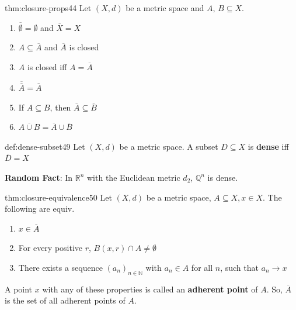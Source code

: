 \documentclass[landscape, 8pt]{extarticle}
\begin{document}
\begin{multicols}{3}
\begin{thm}{thm:closure-props}{44}
    \vspace{-5pt}
    Let $(X, d)$ be a metric space and $A,\,B \subseteq X$.
    \vspace{-15pt}
    \begin{multicols}{2}
        \begin{enumerate}[leftmargin=*]
            \item $\overline{\emptyset} = \emptyset$ and $\overline{X} = X$
            \item $A \subseteq \overline{A}$ and $\overline{A}$ is closed
            \item $A$ is closed iff $A = \overline{A}$
            \item $\overline{\overline{A}} = \overline{A}$
            \item If $A \subseteq B$, then $\overline{A} \subseteq \overline{B}$
            \item $\overline{A \cup B} = \overline{A} \cup \overline{B}$
        \end{enumerate}
    \end{multicols}
\end{thm}


\begin{dfn}{def:dense-subset}{49}
    Let $(X, d)$ be a metric space. A subset $D \subseteq X$ is \textbf{dense} iff $\overline{D} = X$

    \longrule{0.08ex}
    \textbf{Random Fact}: In $\mathbb{R}^{n}$ with the Euclidean metric $d_{2}$, $\mathbb{Q}^{n}$ is dense.
\end{dfn}

\begin{thm}{thm:closure-equivalence}{50}
    \vspace{-5pt}
    Let $(X, d)$ be a metric space, $A \subseteq X, x\in X$. The following are equiv.
    \vspace{-10pt}
    \begin{enumerate}
        \item $x\in\overline{A}$
        \item For every positive $r$, $B(x,r) \cap A \ne \emptyset$
        \item There exists a sequence $(a_{n})_{n\in \mathbb{N}}$ with $a_{n}\in A$ for all $n$, such that $a_{n}\to x$
    \end{enumerate}
    \vspace{-5pt}
    A point $x$ with any of these properties is called an \textbf{adherent point} of $A$. So, $\overline{A}$ is the set of all adherent points of $A$.
\end{thm}


\end{multicols}
\end{document}
